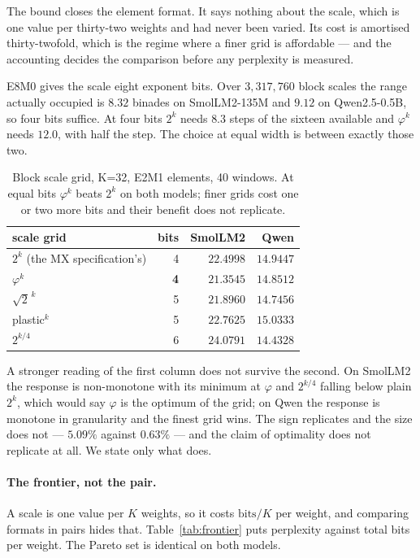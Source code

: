\documentclass[11pt]{article}
\theoremstyle{definition}
\begin{document}
The bound closes the element format. It says nothing about the scale, which is
one value per thirty-two weights and had never been varied. Its cost is
amortised thirty-twofold, which is the regime where a finer grid is affordable
--- and the accounting decides the comparison before any perplexity is measured.

E8M0 gives the scale eight exponent bits. Over $3{,}317{,}760$ block scales the
range actually occupied is $8.32$ binades on SmolLM2-135M and $9.12$ on
Qwen2.5-0.5B, so four bits suffice. At four bits $2^{k}$ needs $8.3$ steps of
the sixteen available and $\varphi^{k}$ needs $12.0$, with half the step. The
choice at equal width is between exactly those two.

\begin{table}[t]\centering
\caption{Block scale grid, K=32, E2M1 elements, 40 windows. At equal bits
$\varphi^{k}$ beats $2^{k}$ on both models; finer grids cost one or two more
bits and their benefit does not replicate.}
\label{tab:scalegrid}
\begin{tabular}{lrrr}
\toprule
scale grid & bits & SmolLM2 & Qwen \\
\midrule
$2^{k}$ (the MX specification's) & 4 & $22.4998$ & $14.9447$ \\
$\varphi^{k}$                    & \textbf{4} & $\mathbf{21.3545}$ & $\mathbf{14.8512}$ \\
$\sqrt{2}^{\,k}$                 & 5 & $21.8960$ & $14.7456$ \\
plastic$^{k}$                    & 5 & $22.7625$ & $15.0333$ \\
$2^{k/4}$                        & 6 & $24.0791$ & $14.4328$ \\
\bottomrule
\end{tabular}
\end{table}

A stronger reading of the first column does not survive the second. On SmolLM2
the response is non-monotone with its minimum at $\varphi$ and $2^{k/4}$ falling
below plain $2^{k}$, which would say $\varphi$ is the optimum of the grid; on
Qwen the response is monotone in granularity and the finest grid wins. The sign
replicates and the size does not --- $5.09\%$ against $0.63\%$ --- and the claim
of optimality does not replicate at all. We state only what does.

\paragraph{The frontier, not the pair.} A scale is one value per $K$ weights,
so it costs $\mathrm{bits}/K$ per weight, and comparing formats in pairs hides
that. Table~\ref{tab:frontier} puts perplexity against total bits per weight.
The Pareto set is identical on both models.
\end{document}

